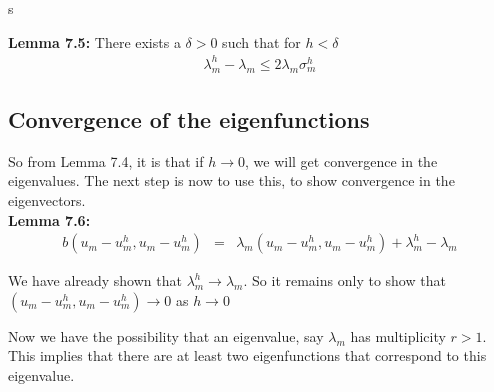 s\documentclass[../../main.tex]{subfiles}
\begin{document}
\textbf{Lemma 7.5:} There exists a $\delta > 0$ such that for $h < \delta$
\begin{eqnarray*}
\lambda_{m}^{h} - \lambda_{m} \leq 2\lambda_{m}\sigma_{m}^{h}
\end{eqnarray*}

\begin{comment}
\textbf{Proof:}
Using Lemma 7.4, choose $\delta$ such that $\sigma_{m}^{h} < \frac{1}{2}$. Then by Lemma 7.1 gives that $\lambda_{m}^{h} < 2\lambda_{m}$. So we have that
$\lambda_{m}^{h} - \lambda_{m} \leq 2\lambda_{m}\sigma_{m}^{h}$.
\qed
\end{comment}

\subsection{Convergence of the eigenfunctions}
So from Lemma 7.4, it is that if $h \rightarrow 0$, we will get convergence in the eigenvalues. The next step is now to use this, to show convergence in the eigenvectors.\\


\textbf{Lemma 7.6:}
\begin{eqnarray*}
b(u_{m}-u_{m}^{h},u_{m}-u_{m}^{h}) &=& \lambda_{m}( u_{m}-u_{m}^{h},u_{m}-u_{m}^{h} ) + \lambda_{m}^{h} - \lambda_{m}
\end{eqnarray*}

\begin{comment}
\textbf{Proof:}
\begin{eqnarray*}
b(u_{m}-u_{m}^{h},u_{m}-u_{m}^{h}) &=& b(u_{m},u_{m}) - 2b(u_{m},u^{h}_{m}) + b(u^{h}_{m},u^{h}_{m}) \\
								&=& \lambda_{m} ( u_{m}, u_{m} ) - 2\lambda_{m} ( u_{m}, u^{h}_{m} ) + \lambda_{m}^{h}( u_{m}^{h},u_{m}^{h} )\\
								&=&  \lambda_{m} - 2\lambda_{m} ( u_{m}, u^{h}_{m} ) + \lambda_{m}^{h} \\
								&=& 2\lambda_{m} - 2\lambda_{m} ( u_{m}, u^{h}_{m} ) + \lambda_{m}^{h} - \lambda_{m}\\
								&=& \lambda_{m}( u_{m}-u_{m}^{h},u_{m}-u_{m}^{h}) + \lambda_{m}^{h} - \lambda_{m}
\end{eqnarray*}
\qed
\end{comment}

We have already shown that $\lambda_{m}^{h} \rightarrow \lambda_{m}$. So it remains only to show that $( u_{m}-u_{m}^{h},u_{m}-u_{m}^{h}) \rightarrow 0$ as $h \rightarrow 0$


Now we have the possibility that an eigenvalue, say $\lambda_{m}$ has multiplicity $r>1$. This implies that there are at least two eigenfunctions that correspond to this eigenvalue.\\
\end{document}
